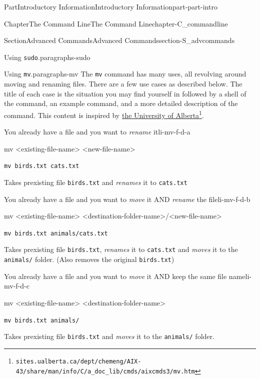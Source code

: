 \documentclass[oneside,10pt,]{book}
\newcommand{\mono}[1]{\texttt{#1}}
\begin{document}
\begin{partptx}{Part}{Introductory Information}{}{Introductory Information}{}{}{part-part-intro}
\begin{chapterptx}{Chapter}{The Command Line}{}{The Command Line}{}{}{chapter-C_commandline}
\begin{sectionptx}{Section}{Advanced Commands}{}{Advanced Commands}{}{}{section-S_advcommands}
\begin{paragraphs}{Using \mono{sudo}.}{paragraphs-sudo}
\end{paragraphs}%
\begin{paragraphs}{Using \mono{mv}.}{paragraphs-mv}%
%
%
%
%
The \mono{mv} command has many uses, all revolving around moving and renaming files. There are a few use cases as described below. The title of each case is the situation you may find yourself in followed by a shell of the command, an example command, and a more detailed description of the command. This content is inspired by \href{https://sites.ualberta.ca/dept/chemeng/AIX-43/share/man/info/C/a_doc_lib/cmds/aixcmds3/mv.htm}{the University of Alberta}\footnote{\nolinkurl{sites.ualberta.ca/dept/chemeng/AIX-43/share/man/info/C/a_doc_lib/cmds/aixcmds3/mv.htm}\label{fn-mv-f-c}}.%
\begin{descriptionlist}
\begin{dlinarrow}{You already have a file and you want to \emph{rename} it}{li-mv-f-d-a}%
%
\begin{codedisplay}
mv <existing-file-name> <new-file-name>
\end{codedisplay}
%
\par
\mono{mv birds.txt cats.txt}%
\par
Takes prexisting file \mono{birds.txt} and \emph{renames} it to \mono{cats.txt}%
\end{dlinarrow}%
\begin{dlinarrow}{You already have a file and you want to \emph{move} it AND \emph{rename} the file}{li-mv-f-d-b}%
%
\begin{codedisplay}
mv <existing-file-name>
	<destination-folder-name>/<new-file-name>
\end{codedisplay}
%
\par
\mono{mv birds.txt animals/cats.txt}%
\par
Takes prexisting file \mono{birds.txt}, \emph{renames} it to \mono{cats.txt} and \emph{moves} it to the \mono{animals/} folder. (Also removes the original \mono{birds.txt})%
\end{dlinarrow}%
\begin{dlinarrow}{You already have a file and you want to \emph{move} it AND keep the same file name}{li-mv-f-d-c}%
%
\begin{codedisplay}
mv <existing-file-name> <destination-folder-name>
\end{codedisplay}
%
\par
\mono{mv birds.txt animals/}%
\par
Takes prexisting file \mono{birds.txt} and \emph{moves} it to the \mono{animals/} folder.%

\end{dlinarrow}
\end{descriptionlist}
\end{paragraphs}
\end{sectionptx}
\end{chapterptx}
\end{partptx}
\end{document}
